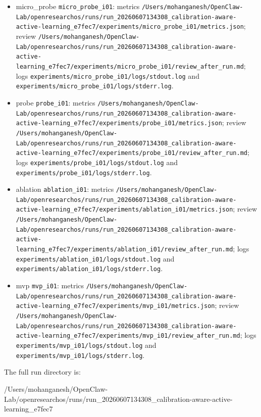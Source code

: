 \documentclass[
  11pt,
]{article}
\newenvironment{Shaded}{}{}
\newcommand{\NormalTok}[1]{#1}
\providecommand{\tightlist}{%
  \setlength{\itemsep}{0pt}\setlength{\parskip}{0pt}}
\begin{document}
\begin{itemize}
\tightlist
\item
  micro\_probe \texttt{micro\_probe\_i01}: metrics \texttt{/Users/mohanganesh/OpenClaw-Lab/openresearchos/runs/run\_20260607134308\_calibration-aware-active-learning\_e7fec7/experiments/micro\_probe\_i01/metrics.json}; review \texttt{/Users/mohanganesh/OpenClaw-Lab/openresearchos/runs/run\_20260607134308\_calibration-aware-active-learning\_e7fec7/experiments/micro\_probe\_i01/review\_after\_run.md}; logs \texttt{experiments/micro\_probe\_i01/logs/stdout.log} and \texttt{experiments/micro\_probe\_i01/logs/stderr.log}.
\item
  probe \texttt{probe\_i01}: metrics \texttt{/Users/mohanganesh/OpenClaw-Lab/openresearchos/runs/run\_20260607134308\_calibration-aware-active-learning\_e7fec7/experiments/probe\_i01/metrics.json}; review \texttt{/Users/mohanganesh/OpenClaw-Lab/openresearchos/runs/run\_20260607134308\_calibration-aware-active-learning\_e7fec7/experiments/probe\_i01/review\_after\_run.md}; logs \texttt{experiments/probe\_i01/logs/stdout.log} and \texttt{experiments/probe\_i01/logs/stderr.log}.
\item
  ablation \texttt{ablation\_i01}: metrics \texttt{/Users/mohanganesh/OpenClaw-Lab/openresearchos/runs/run\_20260607134308\_calibration-aware-active-learning\_e7fec7/experiments/ablation\_i01/metrics.json}; review \texttt{/Users/mohanganesh/OpenClaw-Lab/openresearchos/runs/run\_20260607134308\_calibration-aware-active-learning\_e7fec7/experiments/ablation\_i01/review\_after\_run.md}; logs \texttt{experiments/ablation\_i01/logs/stdout.log} and \texttt{experiments/ablation\_i01/logs/stderr.log}.
\item
  mvp \texttt{mvp\_i01}: metrics \texttt{/Users/mohanganesh/OpenClaw-Lab/openresearchos/runs/run\_20260607134308\_calibration-aware-active-learning\_e7fec7/experiments/mvp\_i01/metrics.json}; review \texttt{/Users/mohanganesh/OpenClaw-Lab/openresearchos/runs/run\_20260607134308\_calibration-aware-active-learning\_e7fec7/experiments/mvp\_i01/review\_after\_run.md}; logs \texttt{experiments/mvp\_i01/logs/stdout.log} and \texttt{experiments/mvp\_i01/logs/stderr.log}.
\end{itemize}

The full run directory is:

\begin{Shaded}
\begin{Highlighting}[]
\NormalTok{/Users/mohanganesh/OpenClaw{-}Lab/openresearchos/runs/run\_20260607134308\_calibration{-}aware{-}active{-}learning\_e7fec7}
\end{Highlighting}
\end{Shaded}
\end{document}
